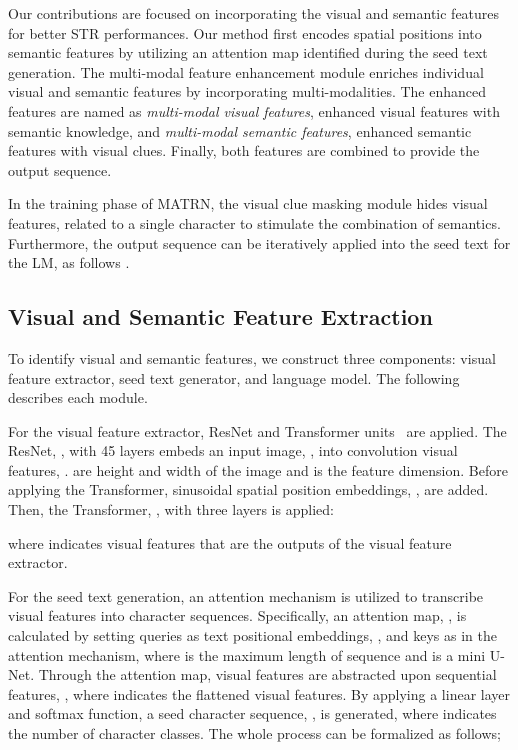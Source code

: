 \documentclass[runningheads]{llncs}
\begin{document}
Our contributions are focused on incorporating the visual and semantic features for better STR performances. Our method first encodes spatial positions into semantic features by utilizing an attention map identified during the seed text generation.
The multi-modal feature enhancement module enriches individual visual and semantic features by incorporating multi-modalities. The enhanced features are named as \textit{multi-modal visual features}, enhanced visual features with semantic knowledge, and \textit{multi-modal semantic features}, enhanced semantic features with visual clues. Finally, both features are combined to provide the output sequence.  

In the training phase of MATRN, the visual clue masking module hides visual features, related to a single character to stimulate the combination of semantics. Furthermore, the output sequence can be iteratively applied into the seed text for the LM, as follows \cite{ABINet}. 

\subsection{Visual and Semantic Feature Extraction}

To identify visual and semantic features, we construct three components: visual feature extractor, seed text generator, and language model. The following describes each module.

For the visual feature extractor, ResNet and Transformer units~\cite{ABINet,Yu_2020_CVPR_SRN} are applied. The ResNet, , with 45 layers embeds an input image, , into convolution visual features, .  are height and width of the image and  is the feature dimension. Before applying the Transformer, sinusoidal spatial position embeddings, , are added. Then, the Transformer, , with three layers is applied:

where  indicates visual features that are the outputs of the visual feature extractor.

For the seed text generation, an attention mechanism is utilized to transcribe visual features into character sequences. Specifically, an attention map, , is calculated by setting queries as text positional embeddings, , and keys as  in the attention mechanism, where  is the maximum length of sequence and  is a mini U-Net. Through the attention map, visual features are abstracted upon sequential features, , where  indicates the flattened visual features. By applying a linear layer and softmax function, a seed character sequence, , is generated, where  indicates the number of character classes. The whole process can be formalized as follows;
\end{document}
